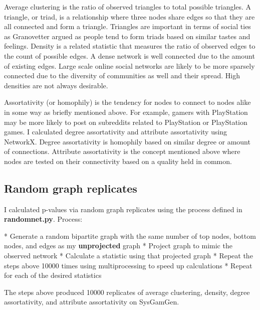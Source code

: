 \documentclass[12pt, a4paper]{article}
\begin{document}
Average clustering is the ratio of observed triangles to total possible triangles. A triangle, or triad, is a relationship where three nodes share edges so that they are all connected and form a triangle. Triangles are important in terms of social ties as Granovetter argued as people tend to form triads based on similar tastes and feelings. Density is a related statistic that measures the ratio of observed edges to the count of possible edges. A dense network is well connected due to the amount of existing edges. Large scale online social networks are likely to be more sparsely connected due to the diversity of communities as well and their spread. High densities are not always desirable.

Assortativity (or homophily) is the tendency for nodes to connect to nodes alike in some way as briefly mentioned above. For example, gamers with PlayStation may be more likely to post on subreddits related to PlayStation or PlayStation games. I calculated degree assortativity and attribute assortativity using NetworkX. Degree assortativity is homophily based on similar degree or amount of connections. Attribute assortativity is the concept mentioned above where nodes are tested on their connectivity based on a quality held in common.

\subsection{Random graph replicates}

I calculated p-values via random graph replicates using the process defined in \textbf{randomnet.py}. Process:

* Generate a random bipartite graph with the same number of top nodes, bottom nodes, and edges as my \textbf{unprojected} graph
* Project graph to mimic the observed network
* Calculate a statistic using that projected graph
* Repeat the steps above 10000 times using multiprocessing to speed up calculations
* Repeat for each of the desired statistics

The steps above produced 10000 replicates of average clustering, density, degree assortativity, and attribute assortativity on SysGamGen.
\end{document}
